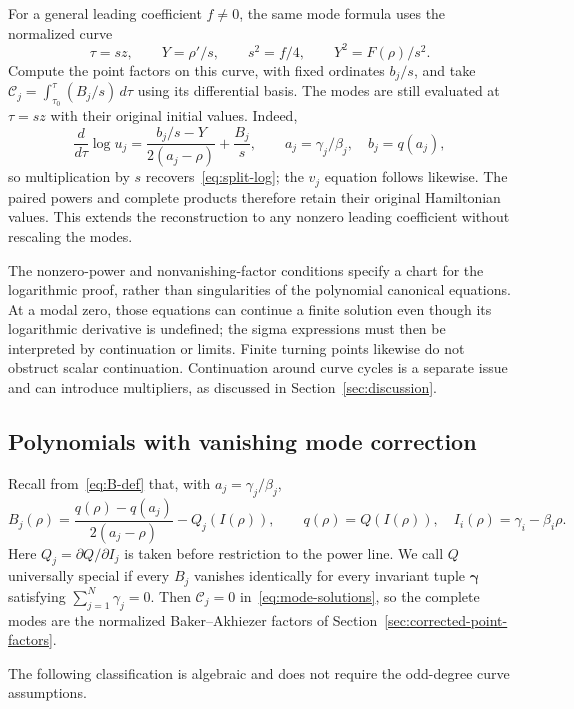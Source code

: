 \documentclass[11pt]{article}
\begin{document}
For a general leading coefficient $f\ne0$, the same mode formula uses the normalized curve
\begin{equation}\label{eq:general-leading-normalization}
 \tau=sz,\qquad Y=\rho'/s,\qquad s^2=f/4,\qquad Y^2=F(\rho)/s^2.
\end{equation}
Compute the point factors on this curve, with fixed ordinates $b_j/s$, and take $\mathcal C_j=\int_{\tau_0}^{\tau} (B_j/s)\,d\tau$ using its differential basis. The modes are still evaluated at $\tau=sz$ with their original initial values. Indeed,
\[
 \frac{d}{d\tau}\log u_j
 =\frac{b_j/s-Y}{2(a_j-\rho)}+\frac{B_j}{s},
 \qquad a_j=\gamma_j/\beta_j,\quad b_j=q(a_j),
\]
so multiplication by $s$ recovers~\eqref{eq:split-log}; the $v_j$ equation follows likewise. The paired powers and complete products therefore retain their original Hamiltonian values. This extends the reconstruction to any nonzero leading coefficient without rescaling the modes.

The nonzero-power and nonvanishing-factor conditions specify a chart for the logarithmic proof, rather than singularities of the polynomial canonical equations. At a modal zero, those equations can continue a finite solution even though its logarithmic derivative is undefined; the sigma expressions must then be interpreted by continuation or limits. Finite turning points likewise do not obstruct scalar continuation. Continuation around curve cycles is a separate issue and can introduce multipliers, as discussed in Section~\ref{sec:discussion}.


\subsection{Polynomials with vanishing mode correction}\label{sec:special-Q}

Recall from~\eqref{eq:B-def} that, with $a_j=\gamma_j/\beta_j$,
\[
 B_j(\rho)=\frac{q(\rho)-q(a_j)}{2(a_j-\rho)}
             -Q_j(I(\rho)),\qquad
 q(\rho)=Q(I(\rho)),\quad I_i(\rho)=\gamma_i-\beta_i\rho.
\]
Here $Q_j=\partial Q/\partial I_j$ is taken before restriction to the power
line. We call $Q$ universally special if every $B_j$ vanishes identically
for every invariant tuple
$\boldsymbol\gamma$ satisfying $\sum_{j=1}^{N}\gamma_j=0$.
Then $\mathcal C_j=0$ in~\eqref{eq:mode-solutions}, so the complete modes
are the normalized Baker--Akhiezer factors of
Section~\ref{sec:corrected-point-factors}.

The following classification is algebraic and does not require the
odd-degree curve assumptions.
\end{document}
